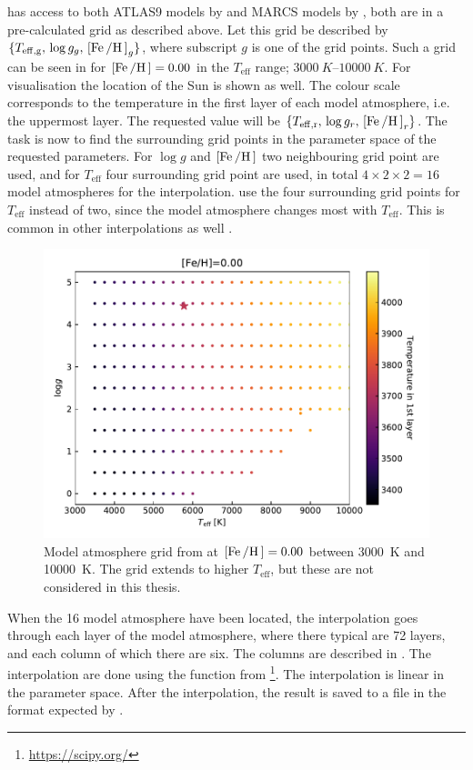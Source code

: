 \FASMA has access to both ATLAS9 models by \citet{Kurucz1993} and MARCS models
by \citet{Gustafson2008}, both are in a pre-calculated grid as described above.
Let this grid be described by $\{T_\mathrm{eff,g},\, \log g_g,\,
[\ion{Fe}/\ion{H}]_g\}$, where subscript $g$ is one of the grid points. Such a
grid can be seen in  for $[\ion{Fe}/\ion{H}]=0.00$ in the
$T_\mathrm{eff}$ range; $\SIrange{3000}{10000}{K}$. For visualisation the
location of the Sun is shown as well. The colour scale corresponds to the
temperature in the first layer of each model atmosphere, i.e. the uppermost
layer. The requested value will be $\{T_\mathrm{eff,r},\,\log
g_r,\,[\ion{Fe}/\ion{H}]_r\}$. The task is now to find the surrounding grid
points in the parameter space of the requested parameters. For $\log g$ and
$[\ion{Fe}/\ion{H}]$ two neighbouring grid point are used, and for
$T_\mathrm{eff}$ four surrounding grid point are used, in total
$4\times2\times2=16$ model atmospheres for the interpolation. \FASMA use the
four surrounding grid points for $T_\mathrm{eff}$ instead of two, since the
model atmosphere changes most with $T_\mathrm{eff}$. This is common in other
interpolations as well \citep[see e.g.][]{Valenti1996}.

\begin{figure}[htpb!]
    \centering
    \includegraphics[width=0.85\linewidth]{figures/model_atmosphere.pdf}
    \caption{Model atmosphere grid from \citet{Kurucz1993} at
             $[\ion{Fe}/\ion{H}]=0.00$ between \SI{3000}{K} and \SI{10000}{K}.
             The grid extends to higher $T_\mathrm{eff}$, but these are not
             considered in this thesis.}
    \label{fig:grid}
\end{figure}

When the 16 model atmosphere have been located, the interpolation goes through
each layer of the model atmosphere, where there typical are 72 layers, and each
column of which there are six. The columns are described in
. The interpolation are done using the
 function from \footnote{\url{https://scipy.org/}}.
The interpolation is linear in the parameter space. After the interpolation, the
result is saved to a file in the format expected by \MOOG.




